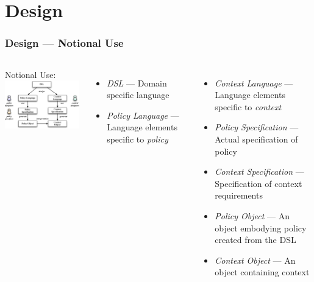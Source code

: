 \documentclass[t, xcolor=dvipsnames, handout, 10pt]{beamer}
\begin{document}
\section{Design}
\begin{frame}[t]
\frametitle{Design --- Notional Use}
\begin{columns}[t]
Notional Use:
\includegraphics[width=2.4in]{players}
\begin{itemize}
\item<2-> \textit{DSL} --- Domain specific language
\item<3-> \textit{Policy Language} --- Language elements specific to \textit{policy}
\end{itemize}
\begin{itemize}
\item<4-> \textit{Context Language} --- Language elements specific to \textit{context}
\item<5-> \textit{Policy Specification} --- Actual specification of policy
\item<6-> \textit{Context Specification} --- Specification of context requirements
\item<7-> \textit{Policy Object} --- An object embodying policy created from the DSL
\item<8-> \textit{Context Object} --- An object containing context
\end{itemize}
\end{columns}
\end{frame}
\end{document}
